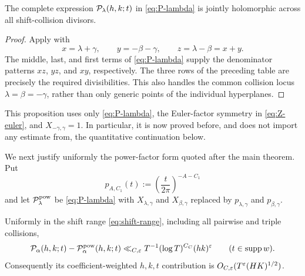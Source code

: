 \begin{proposition}\label{prop:P-holomorphic}
The complete expression $\mathcal P_\lambda(h,k;t)$ in \eqref{eq:P-lambda} is
jointly holomorphic across all shift-collision divisors.
\end{proposition}

\begin{proof}
Apply  with
\begin{equation}\label{eq:P-collision-coordinates}
 x=\lambda+\gamma,\qquad
 y=-\beta-\gamma,\qquad
 z=\lambda-\beta=x+y.
\end{equation}
The middle, last, and first terms of \eqref{eq:P-lambda} supply the
denominator patterns $xz$, $yz$, and $xy$, respectively.  The three rows of
the preceding table are precisely the required divisibilities.  This also
handles the common collision locus $\lambda=\beta=-\gamma$, rather than only
generic points of the individual hyperplanes.
\end{proof}

This proposition uses only \eqref{eq:P-lambda}, the Euler-factor symmetry
in \eqref{eq:Z-euler}, and $X_{-\gamma,\gamma}=1$.  In particular, it is now
proved before, and does not import any estimate from, the quantitative
continuation below.

We next justify uniformly the power-factor form quoted after the main
theorem.  Put
\begin{equation}\label{eq:power-X-def}
 p_{A,C_1}(t):=\left(\frac{t}{2\pi}\right)^{-A-C_1}
\end{equation}
and let $\mathcal P_\lambda^{\rm pow}$ be \eqref{eq:P-lambda} with
$X_{\lambda,\gamma}$ and $X_{\beta,\gamma}$ replaced by
$p_{\lambda,\gamma}$ and $p_{\beta,\gamma}$.

\begin{proposition}
\label{prop:collision-safe-stirling}
Uniformly in the shift range \eqref{eq:shift-range}, including all pairwise
and triple collisions,
\begin{equation}\label{eq:collision-safe-pointwise}
 \mathcal P_\alpha(h,k;t)-\mathcal P_\alpha^{\rm pow}(h,k;t)
 \ll_{C,\varepsilon}T^{-1}(\log T)^{C_C}(hk)^\varepsilon
 \qquad(t\in\mathop{\rm supp} w).
\end{equation}
Consequently its coefficient-weighted $h,k,t$ contribution is
$O_{C,\varepsilon}(T^\varepsilon(HK)^{1/2})$.
\end{proposition}

